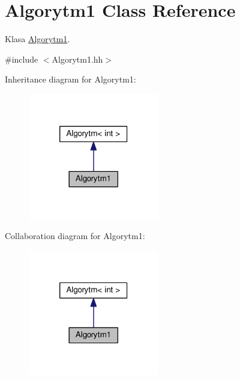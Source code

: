 \hypertarget{a00002}{}\section{Algorytm1 Class Reference}
\label{a00002}


Klasa \hyperlink{a00002}{Algorytm1}.  




{\ttfamily \#include $<$Algorytm1.\+hh$>$}



Inheritance diagram for Algorytm1\+:
\nopagebreak
\begin{figure}[H]
\begin{center}
\leavevmode
\includegraphics[width=162pt]{a00118}
\end{center}
\end{figure}


Collaboration diagram for Algorytm1\+:
\nopagebreak
\begin{figure}[H]
\begin{center}
\leavevmode
\includegraphics[width=162pt]{a00119}
\end{center}
\end{figure}
